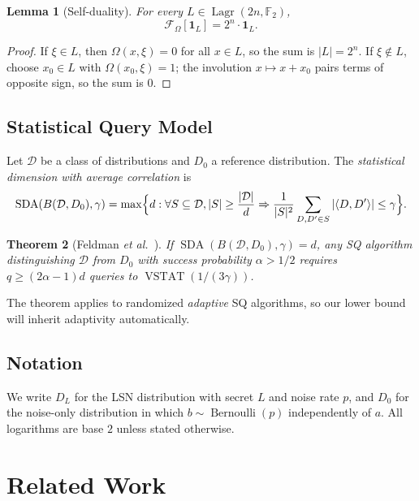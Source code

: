 \documentclass[11pt,a4paper]{article}
\theoremstyle{plain}
\newtheorem{theorem}{Theorem}[section]
\newtheorem{lemma}[theorem]{Lemma}
\theoremstyle{definition}
\newcommand{\F}{\mathbb{F}}
\DeclareMathOperator{\Lagr}{Lagr}
\DeclareMathOperator{\SDA}{SDA}
\DeclareMathOperator{\VSTAT}{VSTAT}
\newcommand{\etal}{\textit{et al.}}
\begin{document}
\begin{lemma}[Self-duality]
For every $L \in \Lagr(2n,\F_2)$,
\[
\mathcal{F}_\Omega[\mathbf{1}_L] = 2^n \cdot \mathbf{1}_L.
\]
\end{lemma}

\begin{proof}
If $\xi \in L$, then $\Omega(x,\xi)=0$ for all $x \in L$, so the sum is $|L|=2^n$. If $\xi \notin L$, choose $x_0 \in L$ with $\Omega(x_0,\xi)=1$; the involution $x \mapsto x+x_0$ pairs terms of opposite sign, so the sum is $0$.
\end{proof}

\subsection{Statistical Query Model}
\label{subsec:sq}

Let $\mathcal{D}$ be a class of distributions and $D_0$ a reference distribution. The \emph{statistical dimension with average correlation} \cite{FGR+17} is
\[
\SDA(B(\mathcal{D},D_0),\gamma) = \max\Bigl\{d : \forall S \subseteq \mathcal{D}, |S| \geq \frac{|\mathcal{D}|}{d} \Rightarrow \frac{1}{|S|^2}\sum_{D,D' \in S} |\langle D,D' \rangle| \leq \gamma\Bigr\}.
\]

\begin{theorem}[Feldman \etal\ \cite{FGR+17}]
\label{thm:feldman}
If $\SDA(B(\mathcal{D},D_0),\gamma) = d$, any SQ algorithm distinguishing $\mathcal{D}$ from $D_0$ with success probability $\alpha > 1/2$ requires $q \geq (2\alpha - 1)d$ queries to $\VSTAT(1/(3\gamma))$.
\end{theorem}

The theorem applies to randomized \emph{adaptive} SQ algorithms, so our lower bound will inherit adaptivity automatically.

\subsection{Notation}
\label{subsec:notation}

We write $D_L$ for the LSN distribution with secret $L$ and noise rate $p$, and $D_0$ for the noise-only distribution in which $b \sim \operatorname{Bernoulli}(p)$ independently of $a$. All logarithms are base $2$ unless stated otherwise.


\section{Related Work}
\label{sec:related}
\end{document}
